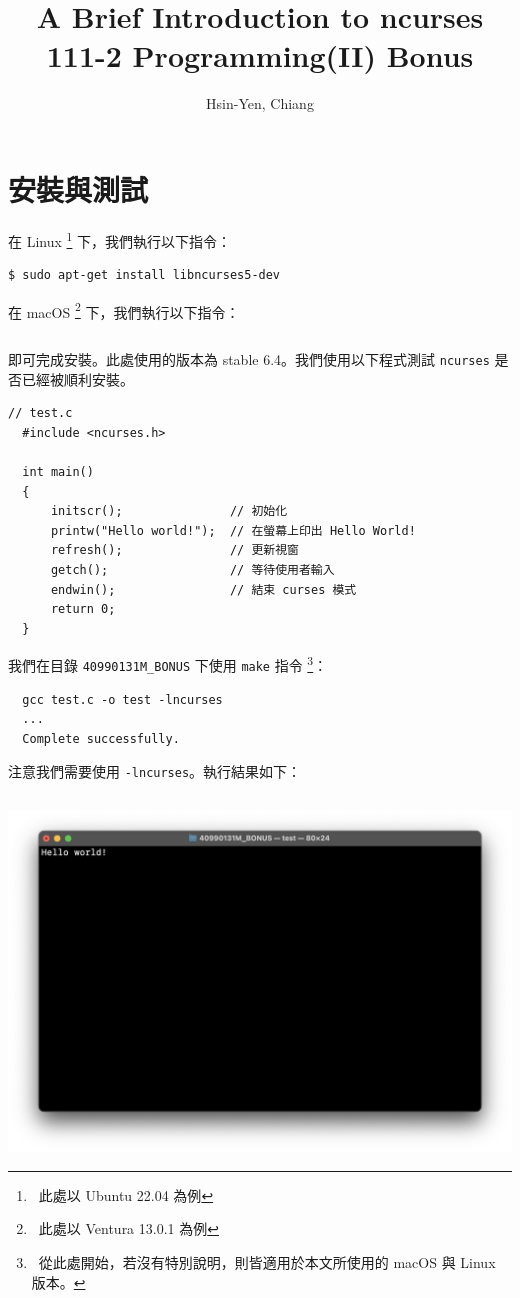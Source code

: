\documentclass[12pt]{article}
\theoremstyle{definition}
\begin{document}
\title{A Brief Introduction to ncurses\\
  \large 111-2 Programming(II) Bonus}
\author{Hsin-Yen, Chiang}
\maketitle
\tableofcontents
\section{安裝與測試}
\noindent
在 Linux \footnote{\ 此處以 Ubuntu 22.04 為例} 下，我們執行以下指令：
\begin{lstlisting}[style=zsh]
  $ sudo apt-get install libncurses5-dev
\end{lstlisting}
在 macOS \footnote{\ 此處以 Ventura 13.0.1 為例} 下，我們執行以下指令：
\begin{lstlisting}[style=zsh]
  % brew install ncurses
\end{lstlisting}
即可完成安裝。此處使用的版本為 stable 6.4。我們使用以下程式測試 \texttt{ncurses} 是否已經被順利安裝。
\begin{lstlisting}[style=C]
  // test.c
  #include <ncurses.h>

  int main()
  {
      initscr();               // 初始化
      printw("Hello world!");  // 在螢幕上印出 Hello World!
      refresh();               // 更新視窗
      getch();                 // 等待使用者輸入
      endwin();                // 結束 curses 模式
      return 0;
  }
\end{lstlisting}

\noindent
我們在目錄 \texttt{40990131M\_BONUS} 下使用 \texttt{make} 指令 \footnote{\ 從此處開始，若沒有特別說明，則皆適用於本文所使用的 macOS 與 Linux 版本。}：
\begin{lstlisting}[style=zsh]
  % make
  gcc test.c -o test -lncurses
  ...
  Complete successfully.
\end{lstlisting}
注意我們需要使用 \texttt{-lncurses}。執行結果如下：
\begin{lstlisting}[style=zsh]
  % ./test
\end{lstlisting}
\begin{center}
    \includegraphics[width=\textwidth]{test.png}
\end{center}
\end{document}
